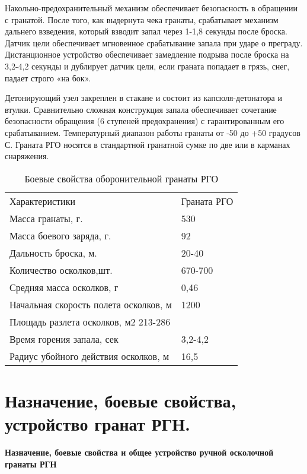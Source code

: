 \documentclass[12pt,a4paper]{report}
\begin{document}
Накольно-предохранительный механизм обеспечивает безопасность в обращении с гранатой. После того, как выдернута чека гранаты, срабатывает механизм дальнего взведения, который взводит запал через 1-1,8 секунды после броска. Датчик цели обеспечивает мгновенное срабатывание запала при ударе о преграду. Дистанционное устройство обеспечивает замедление подрыва после броска на 3,2-4,2 секунды и дублирует датчик цели, если граната попадает в грязь, снег, падает строго «на бок».

Детонирующий узел закреплен в стакане и состоит из капсюля-детонатора и втулки. Сравнительно сложная конструкция запала обеспечивает сочетание безопасности обращения (6 ступеней предохранения) с гарантированным его срабатыванием. Температурный диапазон работы гранаты от -50 до +50 градусов С. Граната РГО носятся в стандартной гранатной сумке по две или в карманах снаряжения.

\begin{table}[h!]
	\caption{Боевые свойства оборонительной гранаты РГО}
	\label{tabular:RGO}
	\begin{center}
		\begin{tabular}{|l|l|}
			\hline
			\rowcolor[gray]{.9} Характеристики &  Граната РГО\\
			Масса гранаты, г.	& 530\\
			Масса боевого заряда, г.	& 92\\
			Дальность броска, м.	& 20-40\\
			Количество осколков,шт.  & 670-700\\
			Средняя масса осколков, г   & 0,46 \\
			Начальная скорость полета осколков, м &1200\\
			Площадь разлета осколков, м2      213-286 \\
			Время горения запала, сек & 3,2-4,2\\
			Радиус убойного действия осколков, м & 16,5\\
			\hline
		\end{tabular}
	\end{center}
\end{table}



\section{Назначение, боевые свойства, устройство гранат РГН.}
\textbf{Назначение, боевые свойства и общее устройство ручной осколочной гранаты РГН}
\end{document}
